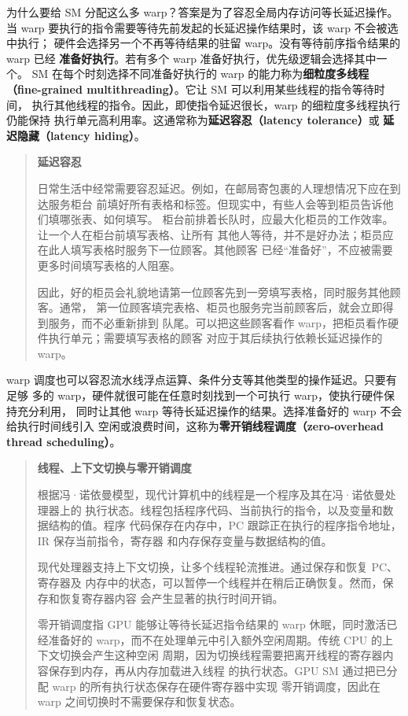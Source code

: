 为什么要给 SM 分配这么多 warp？答案是为了容忍全局内存访问等长延迟操作。当
warp 要执行的指令需要等待先前发起的长延迟操作结果时，该 warp 不会被选中执行；
硬件会选择另一个不再等待结果的驻留 warp。没有等待前序指令结果的 warp 已经
\textbf{准备好执行}。若有多个 warp 准备好执行，优先级逻辑会选择其中一个。
SM 在每个时刻选择不同准备好执行的 warp 的能力称为\textbf{细粒度多线程
（fine-grained multithreading）}。它让 SM 可以利用某些线程的指令等待时间，
执行其他线程的指令。因此，即使指令延迟很长，warp 的细粒度多线程执行仍能保持
执行单元高利用率。这通常称为\textbf{延迟容忍（latency tolerance）}或
\textbf{延迟隐藏（latency hiding）}。

\begin{quote}
\textbf{延迟容忍}

日常生活中经常需要容忍延迟。例如，在邮局寄包裹的人理想情况下应在到达服务柜台
前填好所有表格和标签。但现实中，有些人会等到柜员告诉他们填哪张表、如何填写。
柜台前排着长队时，应最大化柜员的工作效率。让一个人在柜台前填写表格、让所有
其他人等待，并不是好办法；柜员应在此人填写表格时服务下一位顾客。其他顾客
已经“准备好”，不应被需要更多时间填写表格的人阻塞。

因此，好的柜员会礼貌地请第一位顾客先到一旁填写表格，同时服务其他顾客。通常，
第一位顾客填完表格、柜员也服务完当前顾客后，就会立即得到服务，而不必重新排到
队尾。可以把这些顾客看作 warp，把柜员看作硬件执行单元；需要填写表格的顾客
对应于其后续执行依赖长延迟操作的 warp。
\end{quote}

warp 调度也可以容忍流水线浮点运算、条件分支等其他类型的操作延迟。只要有足够
多的 warp，硬件就很可能在任意时刻找到一个可执行 warp，使执行硬件保持充分利用，
同时让其他 warp 等待长延迟操作的结果。选择准备好的 warp 不会给执行时间线引入
空闲或浪费时间，这称为\textbf{零开销线程调度（zero-overhead thread scheduling）}。

\begin{quote}
\textbf{线程、上下文切换与零开销调度}

根据冯·诺依曼模型，现代计算机中的线程是一个程序及其在冯·诺依曼处理器上的
执行状态。线程包括程序代码、当前执行的指令，以及变量和数据结构的值。程序
代码保存在内存中，PC 跟踪正在执行的程序指令地址，IR 保存当前指令，寄存器
和内存保存变量与数据结构的值。

现代处理器支持上下文切换，让多个线程轮流推进。通过保存和恢复 PC、寄存器及
内存中的状态，可以暂停一个线程并在稍后正确恢复。然而，保存和恢复寄存器内容
会产生显著的执行时间开销。

零开销调度指 GPU 能够让等待长延迟指令结果的 warp 休眠，同时激活已经准备好的
warp，而不在处理单元中引入额外空闲周期。传统 CPU 的上下文切换会产生这种空闲
周期，因为切换线程需要把离开线程的寄存器内容保存到内存，再从内存加载进入线程
的执行状态。GPU SM 通过把已分配 warp 的所有执行状态保存在硬件寄存器中实现
零开销调度，因此在 warp 之间切换时不需要保存和恢复状态。
\end{quote}

